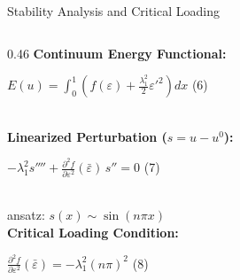 \documentclass[10pt, aspectratio=169]{beamer}
\begin{document}
\begin{frame}{Stability Analysis and Critical Loading}
    \vspace{-0.1cm}
    \begin{columns}[c, onlytextwidth]
        \begin{column}{0.46\textwidth}
            {\footnotesize\bfseries\color{AcademicNavy} Continuum Energy Functional:}\\[0.10cm]
            \colorbox{gray!10}{\begin{minipage}{0.98\linewidth}
                \vspace{0.08cm}
                {\small$E(u) = \int_0^1 \!\left( f(\varepsilon) + \tfrac{\lambda_1^2}{2} \varepsilon'^2 \right) dx$} \hfill {\small(6)}
                \vspace{0.08cm}
            \end{minipage}}\\[0.15cm]

            {\footnotesize\bfseries\color{AcademicNavy} Linearized Perturbation ($s = u - u^0$):}\\[0.10cm]
            \colorbox{gray!10}{\begin{minipage}{0.98\linewidth}
                \vspace{0.08cm}
                {\small$-\lambda_1^2 s'''' + \tfrac{\partial^2 f}{\partial \varepsilon^2}(\bar{\varepsilon})\,s'' = 0$} \hfill {\small(7)}
                \vspace{0.08cm}
            \end{minipage}}\\[0.06cm]
            {\scriptsize\color{gray} ansatz: $s(x) \sim \sin(n\pi x)$}\\[0.12cm]

            {\footnotesize\bfseries\color{AcademicNavy} Critical Loading Condition:}\\[0.10cm]
            \colorbox{gray!10}{\begin{minipage}{0.98\linewidth}
                \vspace{0.08cm}
                {\small$\tfrac{\partial^2 f}{\partial \varepsilon^2}(\bar{\varepsilon}) = -\lambda_1^2(n\pi)^2$} \hfill {\small(8)}
                \vspace{0.08cm}
            \end{minipage}}
        \end{column}


\end{columns}
\end{frame}
\end{document}
